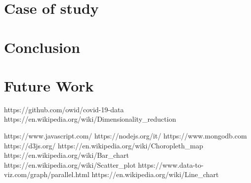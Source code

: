 \documentclass[10pt,conference]{IEEEtran}
\begin{document}
\section{Case of study}

\section{Conclusion}

\section{Future Work}



\begin{thebibliography}{00}

 https://github.com/owid/covid-19-data
 https://en.wikipedia.org/wiki/Dimensionality\_reduction

 https://www.javascript.com/
 https://nodejs.org/it/
 https://www.mongodb.com
 https://d3js.org/
 https://en.wikipedia.org/wiki/Choropleth\_map
 https://en.wikipedia.org/wiki/Bar\_chart
 https://en.wikipedia.org/wiki/Scatter\_plot
 https://www.data-to-viz.com/graph/parallel.html
 https://en.wikipedia.org/wiki/Line\_chart

\end{thebibliography}
\end{document}
